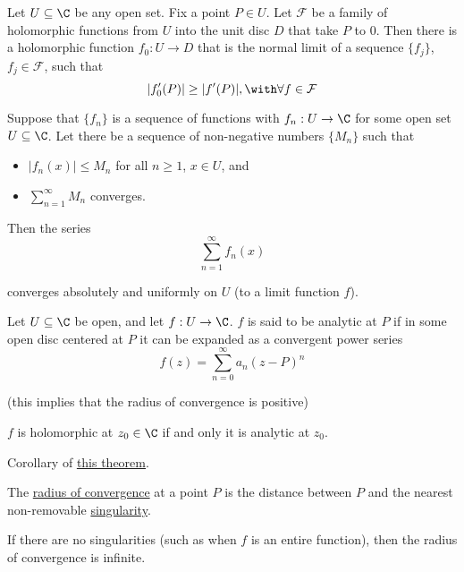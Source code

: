\label{e7d014b}

Let $U\subseteq\C$ be any open set. Fix a point $P\in U$. Let $\mathcal F$ be a
family of holomorphic functions from $U$ into the unit disc $D$ that take $P$
to $0$. Then there is a holomorphic function $f_0:U\to D$ that is the normal
limit of a sequence $\{f_j\}$, $f_j\in\mathcal F$, such that
$$
  |f_0'(P)|\geq|f'(P)|,\with\forall f\in\mathcal F
$$

\label{d4a96c1}

Suppose that $\{f_n\}$ is a sequence of functions with $f_n:U\to\C$ for some
open set $U\subseteq\C$. Let there be a sequence of non-negative numbers
$\{M_n\}$ such that
\begin{itemize}
  \item $|f_n(x)|\leq M_n$ for all $n\geq1$, $x\in U$, and
  \item $\sum_{n=1}^\infty M_n$ converges.
\end{itemize}

Then the series
\begin{equation*}
  \sum_{n=1}^\infty f_n(x)
\end{equation*}

converges absolutely and uniformly on $U$ (to a limit function $f$).

\label{ccd773b}

Let $U\subseteq\C$ be open, and let $f:U\to\C$. $f$ is said to be analytic at
$P$ if in some open disc centered at $P$ it can be expanded as a convergent
power series
$$
  f(z)=\sum_{n=0}^\infty a_n(z-P)^n
$$

(this implies that the radius of convergence is positive)

\label{c1a4a81}

$f$ is holomorphic at $z_0\in\C$ if and only it is analytic at $z_0$.

\label{ddc574e}

Corollary of \href{c1a4a81}{this theorem}.

The \href{da6e337}{radius of convergence} at a point $P$ is the distance
between $P$ and the nearest non-removable \href{a7f062e}{singularity}.

If there are no singularities (such as when $f$ is an entire function), then
the radius of convergence is infinite.
